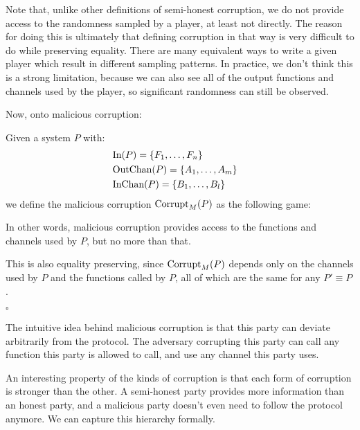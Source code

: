 Note that, unlike other definitions of semi-honest corruption,
we do not provide access to the randomness sampled by a player,
at least not directly.
The reason for doing this is ultimately that defining corruption
in that way is very difficult to do while preserving equality.
There are many equivalent ways to write a given player
which result in different sampling patterns.
In practice, we don't think this is a strong limitation,
because we can also see all of the output functions and
channels used by the player, so significant randomness can still
be observed.

Now, onto malicious corruption:

\begin{definition}
Given a system $P$ with:
$$
\begin{aligned}
  &\text{In}(P) = \{F_1, \ldots, F_n\}\cr
  &\text{OutChan}(P) = \{A_1, \ldots, A_m\}\cr
  &\text{InChan}(P) = \{B_1, \ldots, B_l\}\cr
\end{aligned}
$$
we define the malicious corruption $\text{Corrupt}_M(P)$ as the following game:

In other words, malicious corruption provides access to the functions
and channels used by $P$, but no more than that.

This is also equality preserving, since $\text{Corrupt}_M(P)$ depends
only on the channels used by $P$ and the functions called by $P$,
all of which are the same for any $P' \equiv P$.

$\square$
\end{definition}

The intuitive idea behind malicious corruption is that this party
can deviate arbitrarily from the protocol.
The adversary corrupting this party can call any function this
party is allowed to call, and use any channel this party uses.

An interesting property of the kinds of corruption is that
each form of corruption is stronger than the other.
A semi-honest party provides more information than an honest
party, and a malicious party doesn't even need to follow
the protocol anymore.
We can capture this hierarchy formally.

